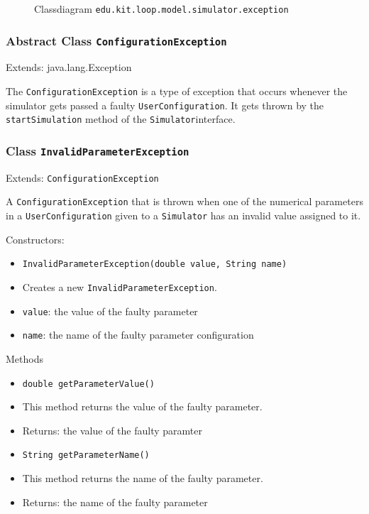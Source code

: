 \documentclass[parskip=full,11pt]{scrartcl}
\begin{document}
\iftrue
\begin{figure}[h]
	\centering
	\fontsize{8}{8}\selectfont
	

	\caption{Classdiagram \texttt{edu.kit.loop.model.simulator.exception}}
\end{figure}
\fi
\subsubsection{Abstract Class \texttt{ConfigurationException }}
Extends: java.lang.Exception

The \texttt{ConfigurationException} is a type of exception that occurs whenever the simulator gets passed a faulty \texttt{UserConfiguration}. It gets thrown by the \texttt{startSimulation} method of the \texttt{Simulator}interface.
\newpage
\subsubsection{Class \texttt{InvalidParameterException}}
Extends: \texttt{ConfigurationException}

A \texttt{ConfigurationException} that is thrown when one of the numerical parameters in a \texttt{UserConfiguration} given to a \texttt{Simulator} has an invalid value assigned to it.

Constructors:
\begin{itemize} \itemsep -10pt
	\item \texttt{InvalidParameterException(double value, String name)}
	\item[] Creates a new \texttt{InvalidParameterException}.
	\item[] \texttt{value}: the value of the faulty parameter
	\item[] \texttt{name}: the name of the faulty parameter configuration
\end{itemize}

Methods
\begin{itemize}\itemsep -10pt
	\item \texttt{double getParameterValue()}
	\item[] This method returns the value of the faulty parameter.
	\item[] Returns: the value of the faulty paramter
	\item \texttt{String getParameterName()}
	\item[] This method returns the name of the faulty parameter.
	\item[] Returns: the name of the faulty parameter
\end{itemize}
\end{document}
